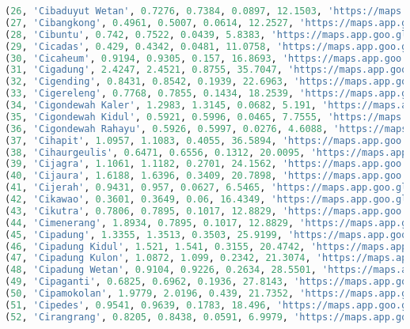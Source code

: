 \begin{lstlisting}[language=SQL]
(26, 'Cibaduyut Wetan', 0.7276, 0.7384, 0.0897, 12.1503, 'https://maps.app.goo.gl/uuDth3kbEdt8yxP38'),
(27, 'Cibangkong', 0.4961, 0.5007, 0.0614, 12.2527, 'https://maps.app.goo.gl/kr3gc2nQhY5NYCr7A'),
(28, 'Cibuntu', 0.742, 0.7522, 0.0439, 5.8383, 'https://maps.app.goo.gl/j2yFgRP4ncwMT8NQ8'),
(29, 'Cicadas', 0.429, 0.4342, 0.0481, 11.0758, 'https://maps.app.goo.gl/JFpRD4HHpZ4nAYGJ9'),
(30, 'Cicaheum', 0.9194, 0.9305, 0.157, 16.8693, 'https://maps.app.goo.gl/waQh9FSqifmvW6p98'),
(31, 'Cigadung', 2.4247, 2.4521, 0.8755, 35.7047, 'https://maps.app.goo.gl/GdPtJ2wf11CtApuM9'),
(32, 'Cigending', 0.8431, 0.8542, 0.1939, 22.6963, 'https://maps.app.goo.gl/EvajE7KtdrcbE73x5'),
(33, 'Cigereleng', 0.7768, 0.7855, 0.1434, 18.2539, 'https://maps.app.goo.gl/bdBjbuET4gyyavDe7'),
(34, 'Cigondewah Kaler', 1.2983, 1.3145, 0.0682, 5.191, 'https://maps.app.goo.gl/2LdAac25kHP1YQ2XA'),
(35, 'Cigondewah Kidul', 0.5921, 0.5996, 0.0465, 7.7555, 'https://maps.app.goo.gl/BqsUrXaTHFRNt3EV9'),
(36, 'Cigondewah Rahayu', 0.5926, 0.5997, 0.0276, 4.6088, 'https://maps.app.goo.gl/aZV6Pki7cntDAUTu8'),
(37, 'Cihapit', 1.0957, 1.1083, 0.4055, 36.5894, 'https://maps.app.goo.gl/y1qa9VwhycxdVNdr7'),
(38, 'Cihaurgeulis', 0.6471, 0.6556, 0.1312, 20.0095, 'https://maps.app.goo.gl/5HPJXXUNJFVMcjPNA'),
(39, 'Cijagra', 1.1061, 1.1182, 0.2701, 24.1562, 'https://maps.app.goo.gl/G4afP1ZWzJmWicZr7'),
(40, 'Cijaura', 1.6188, 1.6396, 0.3409, 20.7898, 'https://maps.app.goo.gl/UkckRaMTFRcn257U8'),
(41, 'Cijerah', 0.9431, 0.957, 0.0627, 6.5465, 'https://maps.app.goo.gl/aWJQMJ5EhEnERaCt9'),
(42, 'Cikawao', 0.3601, 0.3649, 0.06, 16.4349, 'https://maps.app.goo.gl/zrj4KiYer5oDmGga7'),
(43, 'Cikutra', 0.7806, 0.7895, 0.1017, 12.8829, 'https://maps.app.goo.gl/555ar5vRc6GbDVHJ6'),
(44, 'Cimenerang', 1.8934, 0.7895, 0.1017, 12.8829, 'https://maps.app.goo.gl/4PHnUPuVve9FB7Bx7'),
(45, 'Cipadung', 1.3355, 1.3513, 0.3503, 25.9199, 'https://maps.app.goo.gl/eEEbc2YaTvMcPjor6'),
(46, 'Cipadung Kidul', 1.521, 1.541, 0.3155, 20.4742, 'https://maps.app.goo.gl/VcRoYzxBLyYprjob7'),
(47, 'Cipadung Kulon', 1.0872, 1.099, 0.2342, 21.3074, 'https://maps.app.goo.gl/aNALNuTv74uScbgN6'),
(48, 'Cipadung Wetan', 0.9104, 0.9226, 0.2634, 28.5501, 'https://maps.app.goo.gl/8Yfmk5dCD8T64ro37'),
(49, 'Cipaganti', 0.6825, 0.6962, 0.1936, 27.8143, 'https://maps.app.goo.gl/WKb56TEC5zTvkVy89'),
(50, 'Cipamokolan', 1.9779, 2.0196, 0.439, 21.7352, 'https://maps.app.goo.gl/8c1Vg984xTX4MBBAA'),
(51, 'Cipedes', 0.9541, 0.9639, 0.1783, 18.496, 'https://maps.app.goo.gl/tEFrVBCqPvudDHDk7'),
(52, 'Cirangrang', 0.8205, 0.8438, 0.0591, 6.9979, 'https://maps.app.goo.gl/DTuBxWqJjnJRMzYv5'),

\end{lstlisting}
